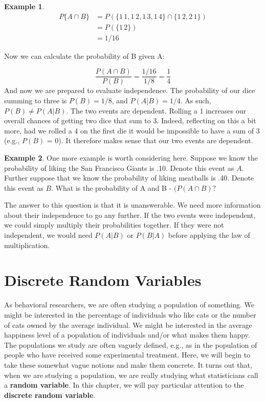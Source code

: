 \documentclass[
]{book}
\theoremstyle{definition}
\theoremstyle{definition}
\newtheorem{example}{Example}[chapter]
\theoremstyle{definition}
\theoremstyle{definition}
\theoremstyle{remark}
\begin{document}
\begin{example}
\begin{align}
P\{A \cap B\} &= P(\{1\,1, 1\,2, 1\,3, 1\,4\} \cap \{1\,2,2\,1\}) \\
&= P(\{1\,2\}) \\
&= 1/16
\end{align}

Now we can calculate the probability of B given A:

\[
\frac{P(A \cap B)}{P(B)} = \frac{1/16}{1/8}= \frac{1}{4}
\]
And now we are prepared to evaluate independence. The probability of our dice summing to three is \(P(B) = 1/8\), and \(P(A|B) = 1/4\). As such, \(P(B) \neq P(A|B)\). The two events are dependent. Rolling a 1 increases our overall chances of getting two dice that sum to 3. Indeed, reflecting on this a bit more, had we rolled a 4 on the first die it would be impossible to have a sum of 3 (e.g., \(P(B)\) = 0). It therefore makes sense that our two events are dependent.
\end{example}

\begin{example}
One more example is worth considering here. Suppose we know the probability of liking the San Francisco Giants is .10. Denote this event as \(A\). Further suppose that we know the probability of liking meatballs is .40. Denote this event as \(B\). What is the probability of A and B - \((P(A \cap B)\)?

The answer to this question is that it is unanswerable. We need more information about their independence to go any further. If the two events were independent, we could simply multiply their probabilities together. If they were not independent, we would need \(P(A|B)\) or \(P(B|A)\) before applying the law of multiplication.
\end{example}

\chapter{Discrete Random Variables}\label{discrete-random-variables}

As behavioral researchers, we are often studying a population of something. We might be interested in the percentage of individuals who like cats or the number of cats owned by the average individual. We might be interested in the average happiness level of a population of individuals and/or what makes them happy. The populations we study are often vaguely defined, e.g., as in the population of people who have received some experimental treatment. Here, we will begin to take these somewhat vague notions and make them concrete. It turns out that, when we are studying a population, we are really studying what statisticians call a \textbf{random variable}. In this chapter, we will pay particular attention to the \textbf{discrete random variable}.
\end{document}
